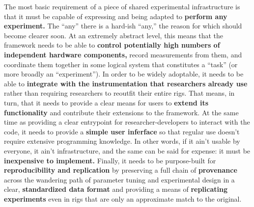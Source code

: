 \documentclass{article}
\begin{document}
The most basic requirement of a piece of shared experimental
infrastructure is that it must be capable of expressing and being
adapted to \textbf{perform any experiment.} The ``any'' there is a
hard-ish ``any,'' the reason for which should become clearer soon. At an
extremely abstract level, this means that the framework needs to be able
to \textbf{control potentially high numbers of independent hardware
components,} record measurements from them, and coordinate them together
in some logical system that constitutes a ``task'' (or more broadly an
``experiment''). In order to be widely adoptable, it needs to be able to
\textbf{integrate with the instrumentation that researchers already use}
rather than requiring researchers to reoutfit their entire rigs. That
means, in turn, that it needs to provide a clear means for users to
\textbf{extend its functionality} and contribute their extensions to the
framework. At the same time as providing a clear entrypoint for
researcher-developers to interact with the code, it needs to provide a
\textbf{simple user inferface} so that regular use doesn't require
extensive programming knowledge. In other words, if it ain't usable by
everyone, it ain't infrastructure, and the same can be said for expense:
it must be \textbf{inexpensive to implement.} Finally, it needs to be
purpose-built for \textbf{reproducibility and replication} by preserving
a full chain of \textbf{provenance} across the wandering path of
parameter tuning and experimental design in a clear,
\textbf{standardized data format} and providing a means of
\textbf{replicating experiments} even in rigs that are only an
approximate match to the original.
\end{document}
